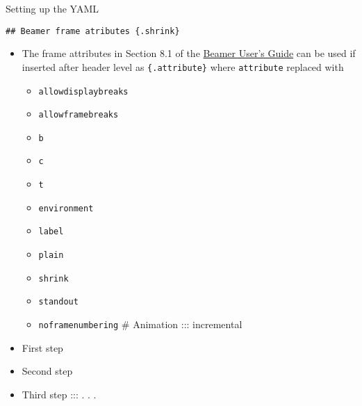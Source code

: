 \documentclass[
  10pt,
  ignorenonframetext,
  aspectratio=169,
]{beamer}
\providecommand{\tightlist}{%
  \setlength{\itemsep}{0pt}\setlength{\parskip}{0pt}}
\begin{document}
\begin{frame}[fragile]{Setting up the YAML}
\begin{verbatim}
## Beamer frame atributes {.shrink}
\end{verbatim}

\begin{itemize}
\tightlist
\item
  The frame attributes in Section 8.1 of the
  \href{http://mirror.aarnet.edu.au/pub/CTAN/macros/latex/contrib/beamer/doc/beameruserguide.pdf}{Beamer
  User's Guide} can be used if inserted after header level as
  \texttt{\{.attribute\}} where \texttt{attribute} replaced with

  \begin{itemize}
  \tightlist
  \item
    \texttt{allowdisplaybreaks}
  \item
    \texttt{allowframebreaks}
  \item
    \texttt{b}
  \item
    \texttt{c}
  \item
    \texttt{t}
  \item
    \texttt{environment}
  \item
    \texttt{label}
  \item
    \texttt{plain}
  \item
    \texttt{shrink}
  \item
    \texttt{standout}
  \item
    \texttt{noframenumbering} \# Animation ::: incremental
  \end{itemize}
\item
  First step
\item
  Second step
\item
  Third step ::: . . .
\end{itemize}
\end{frame}
\end{document}
